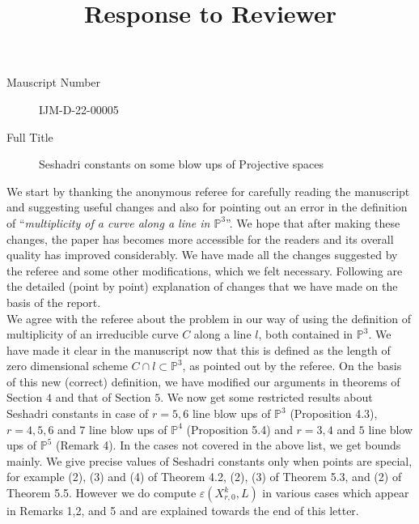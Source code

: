 \documentclass[12pt,twoside,reqno]{amsart}
\numberwithin{equation}{section}
\theoremstyle{definition}
\begin{document}
\title{Response to Reviewer}
\begin{description}
\item [Mauscript Number] IJM-D-22-00005 \\
\item [Full Title] Seshadri constants on some blow ups of Projective spaces
\end{description}

We start by thanking the anonymous referee for carefully reading the manuscript and suggesting 
useful changes and also for pointing out an error in the definition of ``\textit{multiplicity of a curve along a line in $\mathbb{P}^3$}''. We hope that after making these changes, the paper has becomes more accessible for the readers and its overall quality has improved considerably. We have made all the changes suggested by the referee and some other modifications, which we felt necessary. Following are the detailed (point by point) explanation of changes that we have made on the basis of the report. \\

We agree with the referee about the problem in our way of using the definition of multiplicity of an irreducible curve $C$ along a line $l$, both 
contained in $\mathbb{P}^3$. We have made it clear in the manuscript now that this is defined as the length of zero dimensional 
scheme $C \cap l \subset \mathbb{P}^3$, as pointed out by the referee. On the basis of this new (correct) definition, we have modified our arguments in theorems of Section $4$ and that of Section $5$. We now get some restricted results about Seshadri constants in case of $r=5,6$ line blow ups of $\mathbb{P}^3$ (Proposition 4.3), $r=4,5,6$ and $7$ line blow ups of $\mathbb{P}^4$ (Proposition 5.4) and $r=3,4$ and $5$ line blow ups of $\mathbb{P}^5$ (Remark 4).  In the cases not covered in the above list, we get bounds mainly. We give precise values of Seshadri constants only when points are special, for example (2), (3) and (4) of Theorem 4.2, (2), (3) of Theorem 5.3, and (2) of Theorem 5.5. However we do compute $\varepsilon(X_{r,0}^k,L)$ in various cases which appear in Remarks 1,2, and 5 and are explained towards the end of this letter.\\
\end{document}
